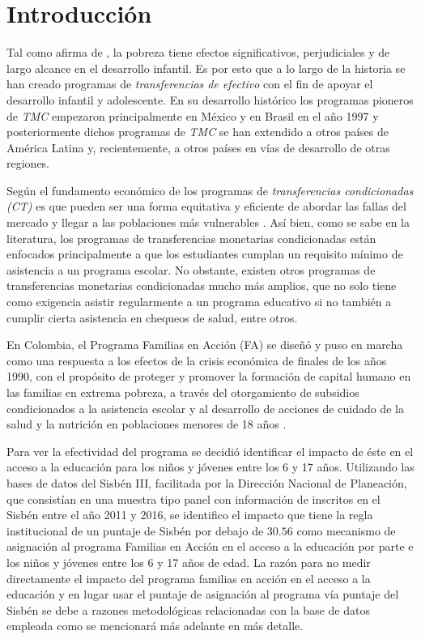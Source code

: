 \documentclass[AER]{AEA}
\begin{document}
\section{Introducción}
    
Tal como afirma de \cite{deWalque2017CashDevelopment}, la pobreza tiene efectos significativos, perjudiciales y de largo alcance  en  el  desarrollo  infantil.   Es  por  esto que  a  lo  largo  de  la  historia  se  han  creado  programas  de \textit{transferencias de efectivo} con el fin de apoyar el desarrollo infantil y adolescente. En su desarrollo histórico los programas pioneros de \textit{TMC} empezaron principalmente en México y en Brasil en el año 1997 y posteriormente dichos programas de \textit{TMC} se han extendido a otros países de América Latina y, recientemente, a otros países en vías de desarrollo de otras regiones.
    
Según \cite{Sugiyama2011TheAmericas} el fundamento económico de los programas de \textit{transferencias condicionadas (CT)} es que pueden ser una forma equitativa y eficiente de abordar las fallas del mercado y llegar a las poblaciones más vulnerables \citep{Fiszbein2009ConditionalReport}. Así bien, como se sabe en la literatura, los programas de transferencias monetarias condicionadas están enfocados principalmente a que los estudiantes cumplan un requisito mínimo de asistencia a un programa escolar. No  obstante,  existen  otros  programas  de  transferencias  monetarias  condicionadas mucho  más amplios, que no solo tiene como exigencia asistir regularmente a un programa educativo si no también a cumplir cierta asistencia en chequeos de salud, entre otros.
     
En Colombia, el Programa Familias en Acción (FA) se diseñó y puso en marcha como una respuesta a los efectos de la crisis económica de finales de los años 1990, con el propósito de proteger y promover la formación de capital humano en las familias en extrema pobreza, a través del otorgamiento de subsidios condicionados a la asistencia escolar y al desarrollo de acciones de cuidado de la salud y la nutrición en poblaciones menores de 18 años \citep{Robles2018Las2001-2018}. 

Para ver la efectividad del programa se decidió identificar el impacto de éste en el acceso a la educación para los niños y jóvenes entre los 6 y 17 años. Utilizando las bases de datos del Sisbén III, facilitada por la Dirección Nacional de Planeación, que consistían en una muestra tipo panel con información de inscritos en el Sisbén entre el año 2011 y 2016, se identifico el impacto que tiene la regla institucional de un puntaje de Sisbén por debajo de $30.56$ como mecanismo de asignación al programa Familias en Acción en el acceso a la educación por parte e los niños y jóvenes entre los 6 y 17 años de edad. La razón para no medir directamente el impacto del programa familias en acción en el acceso a la educación y en lugar usar el puntaje de asignación al programa vía puntaje del Sisbén se debe a razones metodológicas relacionadas con la base de datos empleada como se mencionará más adelante en más detalle. 
\end{document}
